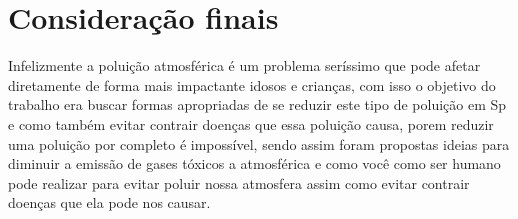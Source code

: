 \documentclass[
	article,			%
	11pt,				%
	oneside,			%
	a4paper,			%
	english,			%
	brazil,				%
	sumario=tradicional
	]{abntex2}
\begin{document}
\section{Consideração finais}
Infelizmente a poluição atmosférica é um problema seríssimo que pode afetar diretamente de forma mais impactante idosos e crianças, com isso o objetivo do trabalho era buscar formas apropriadas de se reduzir este tipo de poluição em Sp e como também evitar contrair doenças que essa poluição causa, porem reduzir uma poluição por completo é impossível, sendo assim foram propostas ideias para diminuir a emissão de gases tóxicos a atmosférica e como você como ser humano pode realizar para evitar poluir nossa atmosfera assim como evitar contrair doenças que ela pode nos causar.  
\end{document}
